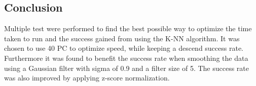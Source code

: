 \subsection{Conclusion}



Multiple test were performed to find the best possible way to optimize the time taken to run and the success gained from using the K-NN algorithm.
It was chosen to use 40 PC to optimize speed, while keeping a descend success rate.
Furthermore it was found to benefit the success rate when smoothing the data using a Gaussian filter with sigma of 0.9 and a filter size of 5.
The success rate was also improved by applying z-score normalization.
